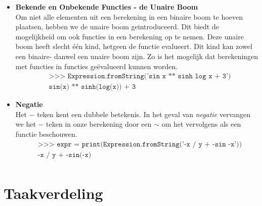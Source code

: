 \documentclass[12pt]{article}
\begin{document}
\begin{itemize}
\item \textbf{Bekende en Onbekende Functies - de Unaire Boom} \\
Om niet alle elementen uit een berekening in een binaire boom te hoeven plaatsen, hebben we de unaire boom geintroduceerd. Dit biedt de mogelijkheid om ook functies in een berekening op te nemen. Deze unaire boom heeft slecht \'e\'en kind, hetgeen de functie evalueert. Dit kind kan zowel een binaire- danwel een unaire boom zijn. Zo is het mogelijk dat berekeningen met functies in functies ge\"evalueerd kunnen worden.
\begin{align*}
&\texttt{>>> Expression.fromString('sin x ** sinh log x + 3')}\\
&\texttt{sin(x) ** sinh(log(x)) + 3}
\end{align*}

\item \textbf{Negatie} \\
Het $-$ teken kent een dubbele betekenis. In het geval van \textit{negatie} vervangen we het $-$ teken in onze berekening door een $\sim$ om het vervolgens als een functie beschouwen. 
\begin{align*}
&\texttt{>>> expr =  print(Expression.fromString('-x / y + -sin -x'))}\\
&\texttt{-x / y + -sin(-x)}\\
\end{align*}
\end{itemize}

\newpage
\section{Taakverdeling}
\end{document}
